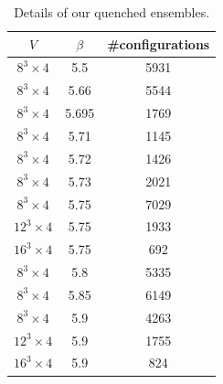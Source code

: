 \documentclass[11pt]{article}
\begin{document}
\begin{table}
\begin{center}
\begin{tabular}{c c c}
$V$ & $\beta$ & \#configurations \\
\hline
$8^3\times 4$ & 5.5 & 5931 \\
$8^3\times 4$ & 5.66 & 5544 \\
$8^3\times 4$ & 5.695 & 1769 \\
$8^3\times 4$ & 5.71 & 1145 \\
$8^3\times 4$ & 5.72 & 1426 \\
$8^3\times 4$ & 5.73 & 2021 \\
$8^3\times 4$ & 5.75 & 7029 \\
$12^3\times 4$ & 5.75 & 1933 \\
$16^3\times 4$ & 5.75 & 692 \\
$8^3\times 4$ & 5.8 & 5335 \\
$8^3\times 4$ & 5.85 & 6149 \\
$8^3\times 4$ & 5.9 & 4263 \\
$12^3\times 4$ & 5.9 & 1755 \\
$16^3\times 4$ & 5.9 &  824 \\
\hline
\end{tabular}
\end{center}
\caption[a]{Details of our quenched ensembles.}
\label{tab:q_ensemb}
\end{table}
\end{document}
